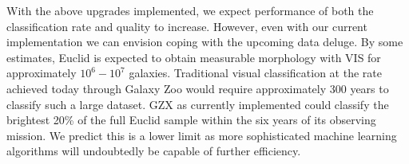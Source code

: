 \documentclass[twocolumn]{aastex6}
\begin{document}
With the above upgrades implemented, we expect performance of both the
classification rate and quality to increase. However, even with our current 
implementation we can envision coping with the upcoming data deluge. 
By some estimates, Euclid is expected to obtain
measurable morphology with VIS for approximately $10^6 - 10^7$ galaxies.
Traditional visual classification at the rate achieved today through Galaxy Zoo 
would require approximately 300 years to classify such a large dataset. 
GZX as currently implemented could  classify the brightest 20\% of the full 
Euclid sample within the six years of its observing mission. 
We predict this is a lower limit as more sophisticated machine learning algorithms
will undoubtedly be capable of further efficiency. 


\end{document}
